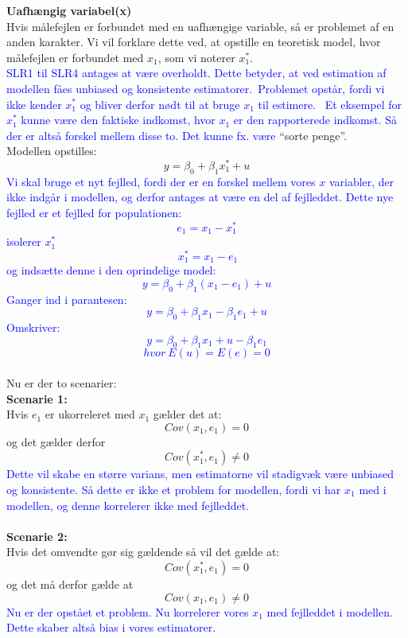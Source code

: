 \documentclass[
  10pt,
]{article}
\begin{document}
\textbf{Uafhængig variabel(x)}\\
Hvis målefejlen er forbundet med en uafhængige variable, så er problemet
af en anden karakter. Vi vil forklare dette ved, at opstille en
teoretisk model, hvor målefejlen er forbundet med \(x_1\), som vi
noterer \(x^*_1\).\\
\textcolor{blue}{SLR1 til SLR4 antages at være overholdt. Dette betyder, at ved estimation af modellen fåes unbiased og konsistente estimatorer.\
Problemet opstår, fordi vi ikke kender $x^*_1$ og bliver derfor nødt til at bruge $x_1$ til estimere. \
Et eksempel for $x^*_1$ kunne være den faktiske indkomst, hvor $x_1$ er den rapporterede indkomst. Så der er altså forskel mellem disse to. Det kunne fx. være}
``sorte penge''.\\
Modellen opstilles: \[ y=\beta_0+\beta_1x^\ast_1 +u\]
\textcolor{blue}{Vi skal bruge et nyt fejlled, fordi der er en forskel mellem vores $x$ variabler, der ikke indgår i modellen, og derfor antages at være en del af fejlleddet. Dette nye fejlled er et fejlled for populationen:
\[ e_1 =x_1-x^\ast_1\] 
isolerer $x_1^*$
\[\ x^\ast_1=x_1-e_1 \]
og indsætte denne i den oprindelige model:
\[ y=\beta_0+\beta_1(x_1-e_1) +u\]
Ganger ind i parantesen: 
\[ y=\beta_0+\beta_1x_1-\beta_1e_1 +u \]
Omskriver: 
\[y=\beta_0+\beta_1x_1+u-\beta_1e_1 \]
\[hvor\ E(u)=E(e)=0 \]}\\
Nu er der to scenarier:\\
\textbf{Scenarie 1:}\\
Hvis \(e_1\) er ukorreleret med \(x_1\) gælder det at:
\[ Cov(x_1,e_1)=0\] og det gælder derfor \[ Cov(x^\ast_1,e_1)\neq0 \]
\textcolor{blue}{Dette vil skabe en større varians, men estimatorne vil stadigvæk være unbiased og konsistente. Så dette er ikke et problem for modellen, fordi vi har $x_1$ med i modellen, og denne korrelerer ikke med fejlleddet.}\\
~\\
\textbf{Scenarie 2:}\\
Hvis det omvendte gør sig gældende så vil det gælde at:
\[ Cov(x^\ast_1,e_1)=0 \] og det må derfor gælde at
\[ Cov(x_1,e_1)\neq0\]
\textcolor{blue}{Nu er der opstået et problem. Nu korrelerer vores $x_1$ med fejlleddet i modellen. Dette skaber altså bias i vores estimatorer. }
\newpage


\end{document}

